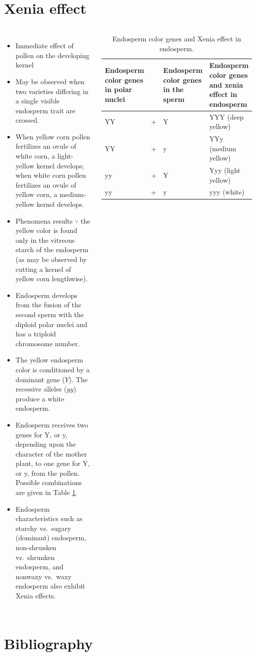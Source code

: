 \documentclass[11pt,ignorenonframetext,aspectratio=169]{beamer}
\providecommand{\tightlist}{%
  \setlength{\itemsep}{0pt}\setlength{\parskip}{0pt}}
\newcommand{\bcolumns}{\begin{columns}[T, onlytextwidth]}
\newcommand{\ecolumns}{\end{columns}}
\begin{document}
\hypertarget{xenia-effect}{%
\section{Xenia effect}\label{xenia-effect}}

\begin{frame}{}
\protect\hypertarget{section-23}{}
\bcolumns
{}
\footnotesize

\begin{itemize}
\tightlist
\item
  Immediate effect of pollen on the developing kernel
\item
  May be observed when two varieties differing in a single visible
  endosperm trait are crossed.
\item
  When yellow corn pollen fertilizes an ovule of white corn, a
  light-yellow kernel develops; when white corn pollen fertilizes an
  ovule of yellow corn, a medium-yellow kernel develops.
\item
  Phenomena results \(\because\) the yellow color is found only in the
  vitreous starch of the endosperm (as may be observed by cutting a
  kernel of yellow corn lengthwise).
\item
  Endosperm develops from the fusion of the second sperm with the
  diploid polar nuclei and has a triploid chromosome number.
\item
  The yellow endosperm color is conditioned by a dominant gene (\(Y\)).
  The recessive alleles (\(yy\)) produce a white endosperm.
\item
  Endosperm receives two genes for Y, or y, depending upon the character
  of the mother plant, to one gene for Y, or y, from the pollen.
  Possible combinations are given in Table \ref{tab:xenia-effect}.
\item
  Endosperm characteristics such as starchy vs.~sugary (dominant)
  endosperm, non-shrunken vs.~shrunken endosperm, and nonwaxy vs.~waxy
  endosperm also exhibit Xenia effects.
\end{itemize}


\begin{table}

\caption{\label{tab:xenia-effect}Endosperm color genes and Xenia effect in endosperm.}
\centering
\fontsize{5}{7}\selectfont
\begin{tabular}[t]{>{\raggedright\arraybackslash}p{6em}>{\raggedright\arraybackslash}p{2em}>{\raggedright\arraybackslash}p{7em}>{\raggedright\arraybackslash}p{8em}}
\toprule
Endosperm color genes in polar nuclei &   & Endosperm color genes in the sperm & Endosperm color genes and xenia effect in endosperm\\
\midrule
YY & + & Y & YYY (deep yellow)\\
YY & + & y & YYy (medium yellow)\\
yy & + & Y & Yyy (light yellow)\\
yy & + & y & yyy (white)\\
\bottomrule
\end{tabular}
\end{table}

\ecolumns
\end{frame}

\hypertarget{bibliography}{%
\section{Bibliography}\label{bibliography}}
\end{document}
